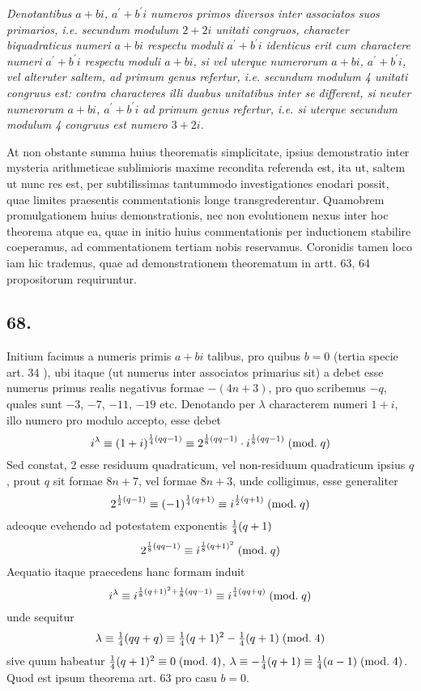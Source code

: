 \documentclass[twoside,12pt]{memoir}
\renewcommand{\pmod}[1]{\;(\textrm{mod.}\;#1)}
\let\oldfrac\frac
\def\frac#1#2{\mathchoice{\tfrac{#1}{#2}}{\oldfrac{#1}{#2}}{\genfrac{}{}{}{2}{#1}{#2\mathstrut}}{\genfrac{}{}{}{3}{#1}{#2\mathstrut}}}
\begin{document}
\textit{Denotantibus \(a+b i\), \( a^{\prime}+b^{\prime} i\) numeros primos diversos inter associatos suos primarios, i.e. secundum modulum \(2+2 i\) unitati congruos, character biquadraticus numeri \(a+b i\) respectu moduli \(a^{\prime}+b^{\prime} i\) identicus erit cum charactere numeri \(a^{\prime}+b^{\prime} i\) respectu moduli \(a+b i\), si vel uterque numerorum \(a+b i\), \(a^{\prime}+b^{\prime} i\), vel alteruter saltem, ad primum genus refertur, i.e. secundum modulum 4 unitati congruus est: contra characteres illi duabus unitatibus inter se different, si neuter numerorum \(a+b i\), \(a^{\prime}+b^{\prime} i\) ad primum genus refertur, i.e. si uterque secundum modulum 4 congruus est numero \(3+2 i\).}\pagebreak%
 
At non obstante summa huius theorematis simplicitate, ipsius demonstratio inter mysteria arithmeticae sublimioris maxime recondita referenda est, ita ut, saltem ut nunc res est, per subtilissimas tantummodo investigationes enodari possit, quae limites praesentis commentationis longe transgrederentur. Quamobrem promulgationem huius demonstrationis, nec non evolutionem nexus inter hoc theorema atque ea, quae in initio huius commentationis per inductionem stabilire coeperamus, ad commentationem tertiam nobis reservamus. Coronidis tamen loco iam hic trademus, quae ad demonstrationem theorematum in artt. 63, 64 propositorum requiruntur.

\subsection*{68.}
 
Initium facimus a numeris primis \(a+b i\) talibus, pro quibus \(b=0\) (tertia specie art. 34 ), ubi itaque (ut numerus inter associatos primarius sit) a debet esse numerus primus realis negativus formae \(-(4 n+3)\), pro quo scribemus \(-q\), quales sunt \(-3\), \(-7\), \(-11\), \(-19\) etc. Denotando per \(\lambda\) characterem numeri \(1+i\), illo numero pro modulo accepto, esse debet
\[i^{\lambda} \equiv(1+i)^{\frac{1}{4}(q q-1)} \equiv 2^{\frac{1}{8}(q q-1)} \cdot i^{\frac{1}{8}(q q-1)}\pmod{q}\]
Sed constat, 2 esse residuum quadraticum, vel non-residuum quadraticum ipsius \(q\), prout \(q\) sit formae \(8 n+7\), vel formae \(8 n+3\), unde colligimus, esse generaliter
\[2^{\frac{1}{2}(q-1)} \equiv(-1)^{\frac{1}{4}(q+1)} \equiv i^{\frac{1}{2}(q+1)}\pmod{q}\]
adeoque evehendo ad potestatem exponentis \(\frac{1}{4}(q+1)\)
\[2^{\frac{1}{8}(q q-1)} \equiv i^{\frac{1}{8}(q+1)^{2}}\pmod{q}\]
Aequatio itaque praecedens hanc formam induit
\[i^{\lambda} \equiv i^{\frac{1}{8}(q+1)^{2}+\frac{1}{8}(q q-1)} \equiv i^{\frac{1}{4}(q q+q)}\pmod{q}\]
unde sequitur
\[\lambda \equiv \frac{1}{4}(q q+q) \equiv \frac{1}{4}(q+1)^{2}-\frac{1}{4}(q+1)\pmod{4}\]
sive quum habeatur \(\frac{1}{4}(q+1)^{2} \equiv 0\pmod{4}\), \( \lambda \equiv-\frac{1}{4}(q+1) \equiv \frac{1}{4}(a-1)\pmod{4}\).
Quod est ipsum theorema art. 63 pro casu \(b=0\).\pagebreak%
\end{document}
